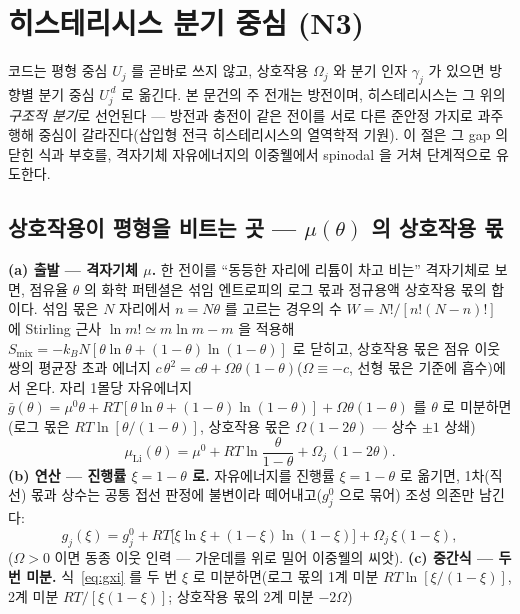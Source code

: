 \documentclass[11pt,a4paper]{article}
\begin{document}
\section{히스테리시스 분기 중심 (N3)}\label{sec:hys}
코드는 평형 중심 $U_j$ 를 곧바로 쓰지 않고, 상호작용 $\Omega_j$ 와 분기 인자 $\gamma_j$ 가 있으면 방향별 분기 중심
$U_j^{\,d}$ 로 옮긴다. 본 문건의 주 전개는 방전이며, 히스테리시스는 그 위의 \emph{구조적 분기}로 선언된다 — 방전과 충전이
같은 전이를 서로 다른 준안정 가지로 과주행해 중심이 갈라진다(삽입형 전극 히스테리시스의 열역학적 기원\cite{dreyer2010}).
이 절은 그 gap 의 닫힌 식과 부호를, 격자기체 자유에너지의
이중웰에서 spinodal 을 거쳐 단계적으로 유도한다.

\subsection{상호작용이 평형을 비트는 곳 — $\mu(\theta)$ 의 상호작용 몫}
\textbf{(a) 출발 — 격자기체 $\mu$.} 한 전이를 ``동등한 자리에 리튬이 차고 비는'' 격자기체로 보면, 점유율 $\theta$ 의 화학
퍼텐셜은 섞임 엔트로피의 로그 몫과 정규용액 상호작용 몫의 합이다. 섞임 몫은 $N$ 자리에서 $n=N\theta$ 를 고르는 경우의
수 $W=N!/[n!(N-n)!]$ 에 Stirling 근사 $\ln m!\simeq m\ln m-m$ 을 적용해
$S_\mathrm{mix}=-k_BN[\theta\ln\theta+(1-\theta)\ln(1-\theta)]$ 로 닫히고, 상호작용 몫은 점유 이웃 쌍의 평균장 초과
에너지 $c\,\theta^2=c\theta+\Omega\theta(1-\theta)$($\Omega\equiv-c$, 선형 몫은 기준에 흡수)에서 온다. 자리 1몰당
자유에너지 $\bar g(\theta)=\mu^0\theta+RT[\theta\ln\theta+(1-\theta)\ln(1-\theta)]+\Omega\theta(1-\theta)$ 를
$\theta$ 로 미분하면(로그 몫은 $RT\ln[\theta/(1-\theta)]$, 상호작용 몫은 $\Omega(1-2\theta)$ — 상수 $\pm1$ 상쇄)
\begin{equation}
\mu_\mathrm{Li}(\theta)=\mu^0+RT\ln\frac{\theta}{1-\theta}+\Omega_j\,(1-2\theta).
\label{eq:mu}
\end{equation}
\textbf{(b) 연산 — 진행률 $\xi=1-\theta$ 로.} 자유에너지를 진행률 $\xi=1-\theta$ 로 옮기면, 1차(직선) 몫과 상수는
공통 접선 판정에 불변이라 떼어내고($g_j^0$ 으로 묶어) 조성 의존만 남긴다:
\begin{equation}
g_j(\xi)=g_j^0+RT\big[\xi\ln\xi+(1-\xi)\ln(1-\xi)\big]+\Omega_j\,\xi(1-\xi),
\label{eq:gxi}
\end{equation}
($\Omega>0$ 이면 동종 이웃 인력 — 가운데를 위로 밀어 이중웰의 씨앗). \textbf{(c) 중간식 — 두 번 미분.}
식~\eqref{eq:gxi} 를 두 번 $\xi$ 로 미분하면(로그 몫의 1계 미분 $RT\ln[\xi/(1-\xi)]$, 2계 미분
$RT/[\xi(1-\xi)]$; 상호작용 몫의 2계 미분 $-2\Omega$)
\end{document}
